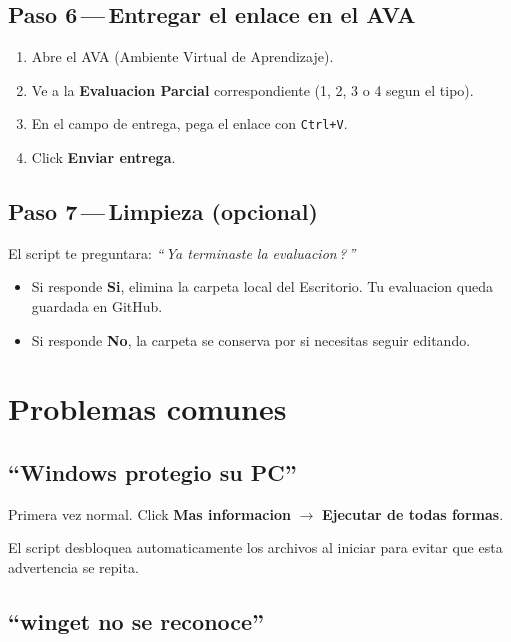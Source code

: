 \documentclass[11pt,a4paper,oneside]{report}
\begin{document}
\section{Paso 6\,---\,Entregar el enlace en el AVA}

\begin{enumerate}
  \item Abre el AVA (Ambiente Virtual de Aprendizaje).
  \item Ve a la \textbf{Evaluacion Parcial} correspondiente (1, 2, 3 o 4 segun el tipo).
  \item En el campo de entrega, pega el enlace con \texttt{Ctrl+V}.
  \item Click \textbf{Enviar entrega}.
\end{enumerate}

\section{Paso 7\,---\,Limpieza (opcional)}

El script te preguntara: \emph{\textquotedblleft\,Ya terminaste la evaluacion\,?\,\textquotedblright}

\begin{itemize}
  \item Si responde \textbf{Si}, elimina la carpeta local del Escritorio. Tu evaluacion queda guardada en GitHub.
  \item Si responde \textbf{No}, la carpeta se conserva por si necesitas seguir editando.
\end{itemize}

\chapter{Problemas comunes}

\section{\textquotedblleft Windows protegio su PC\textquotedblright}

Primera vez normal. Click \textbf{Mas informacion} $\rightarrow$ \textbf{Ejecutar de todas formas}.

El script desbloquea automaticamente los archivos al iniciar para evitar que esta advertencia se repita.

\section{\textquotedblleft winget no se reconoce\textquotedblright}
\end{document}
